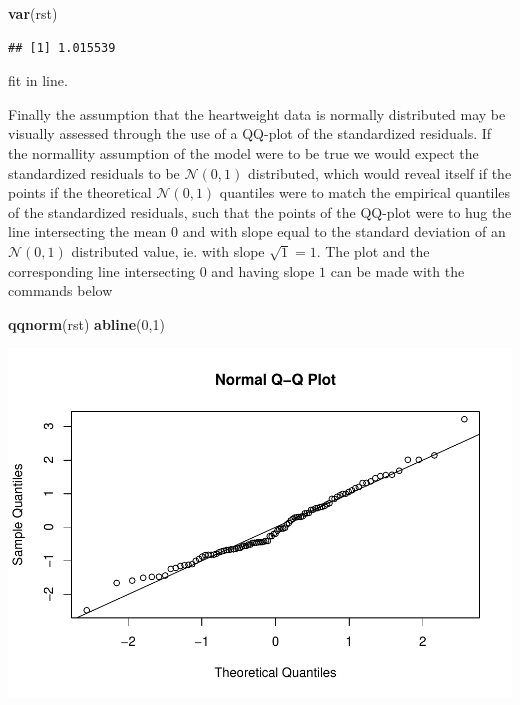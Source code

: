 \documentclass[
]{article}
\newenvironment{Shaded}{\begin{snugshade}}{\end{snugshade}}
\newcommand{\DecValTok}[1]{\textcolor[rgb]{0.00,0.00,0.81}{#1}}
\newcommand{\KeywordTok}[1]{\textcolor[rgb]{0.13,0.29,0.53}{\textbf{#1}}}
\newcommand{\NormalTok}[1]{#1}
\begin{document}
\begin{Shaded}
\begin{Highlighting}[]
\KeywordTok{var}\NormalTok{(rst)}
\end{Highlighting}
\end{Shaded}

\begin{verbatim}
## [1] 1.015539
\end{verbatim}

fit in line.

Finally the assumption that the heartweight data is normally distributed
may be visually assessed through the use of a QQ-plot of the
standardized residuals. If the normallity assumption of the model were
to be true we would expect the standardized residuals to be
\(\mathcal{N}(0,1)\) distributed, which would reveal itself if the
points if the theoretical \(\mathcal{N}(0,1)\) quantiles were to match
the empirical quantiles of the standardized residuals, such that the
points of the QQ-plot were to hug the line intersecting the mean \(0\)
and with slope equal to the standard deviation of an
\(\mathcal{N}(0,1)\) distributed value, ie. with slope \(\sqrt{1}=1\).
The plot and the corresponding line intersecting \(0\) and having slope
\(1\) can be made with the commands below

\begin{Shaded}
\begin{Highlighting}[]
\KeywordTok{qqnorm}\NormalTok{(rst)}
\KeywordTok{abline}\NormalTok{(}\DecValTok{0}\NormalTok{,}\DecValTok{1}\NormalTok{)}
\end{Highlighting}
\end{Shaded}

\begin{center}\includegraphics{matstatproblems20-21_files/figure-latex/unnamed-chunk-10-1} \end{center}
\end{document}
